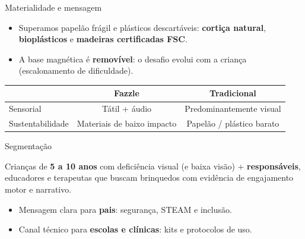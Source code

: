 \documentclass[aspectratio=169,11pt]{beamer}
\begin{document}
\begin{frame}{Materialidade e mensagem}
  \begin{itemize}\setlength\itemsep{0.4em}
    \item Superamos papelão frágil e plásticos descartáveis: \textbf{cortiça natural}, \textbf{bioplásticos} e \textbf{madeiras certificadas FSC}.
    \item A base magnética é \textbf{removível}: o desafio evolui com a criança (escalonamento de dificuldade).
  \end{itemize}
  \vspace{0.5em}
  \begin{center}
    \begin{tabular}{@{}lcc@{}}
      \toprule
      & \textbf{Fazzle} & \textbf{Tradicional} \\
      \midrule
      Sensorial & Tátil + áudio & Predominantemente visual \\
      Sustentabilidade & Materiais de baixo impacto & Papelão / plástico barato \\
      \bottomrule
    \end{tabular}
  \end{center}
\end{frame}

\begin{frame}{Segmentação}
  \begin{fazzlecta}
    Crianças de \textbf{5 a 10 anos} com deficiência visual (e baixa visão) + \textbf{responsáveis}, educadores e terapeutas que buscam brinquedos com evidência de engajamento motor e narrativo.
  \end{fazzlecta}
  \vspace{0.6em}
  \begin{itemize}\setlength\itemsep{0.35em}
    \item Mensagem clara para \textbf{pais}: segurança, STEAM e inclusão.
    \item Canal técnico para \textbf{escolas e clínicas}: kits e protocolos de uso.
  \end{itemize}
\end{frame}
\end{document}
